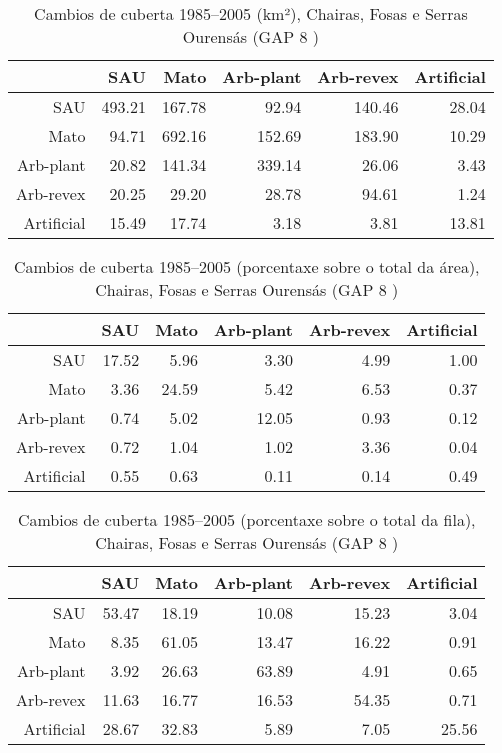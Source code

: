 \clearpage
\begin{table}[p]
\centering
\caption{Cambios de cuberta 1985--2005 (km²), Chairas, Fosas e Serras Ourensás (GAP 8 )} 
\label{TaboaContinxGAP8}
\begin{tabular}{rrrrrr}
  \hline
 & SAU & Mato & Arb-plant & Arb-revex & Artificial \\ 
  \hline
SAU & 493.21 & 167.78 & 92.94 & 140.46 & 28.04 \\ 
  Mato & 94.71 & 692.16 & 152.69 & 183.90 & 10.29 \\ 
  Arb-plant & 20.82 & 141.34 & 339.14 & 26.06 & 3.43 \\ 
  Arb-revex & 20.25 & 29.20 & 28.78 & 94.61 & 1.24 \\ 
  Artificial & 15.49 & 17.74 & 3.18 & 3.81 & 13.81 \\ 
   \hline
\end{tabular}
\end{table}
\begin{table}[p]
\centering
\caption{Cambios de cuberta 1985--2005 (porcentaxe sobre o total da área), Chairas, Fosas e Serras Ourensás (GAP 8 )} 
\label{TaboaContinxPTGAP8}
\begin{tabular}{rrrrrr}
  \hline
 & SAU & Mato & Arb-plant & Arb-revex & Artificial \\ 
  \hline
SAU & 17.52 & 5.96 & 3.30 & 4.99 & 1.00 \\ 
  Mato & 3.36 & 24.59 & 5.42 & 6.53 & 0.37 \\ 
  Arb-plant & 0.74 & 5.02 & 12.05 & 0.93 & 0.12 \\ 
  Arb-revex & 0.72 & 1.04 & 1.02 & 3.36 & 0.04 \\ 
  Artificial & 0.55 & 0.63 & 0.11 & 0.14 & 0.49 \\ 
   \hline
\end{tabular}
\end{table}
\begin{table}[p]
\centering
\caption{Cambios de cuberta 1985--2005 (porcentaxe sobre o total da fila), Chairas, Fosas e Serras Ourensás (GAP 8 )} 
\label{TaboaContinxPFGAP8}
\begin{tabular}{rrrrrr}
  \hline
 & SAU & Mato & Arb-plant & Arb-revex & Artificial \\ 
  \hline
SAU & 53.47 & 18.19 & 10.08 & 15.23 & 3.04 \\ 
  Mato & 8.35 & 61.05 & 13.47 & 16.22 & 0.91 \\ 
  Arb-plant & 3.92 & 26.63 & 63.89 & 4.91 & 0.65 \\ 
  Arb-revex & 11.63 & 16.77 & 16.53 & 54.35 & 0.71 \\ 
  Artificial & 28.67 & 32.83 & 5.89 & 7.05 & 25.56 \\ 
   \hline
\end{tabular}
\end{table}
